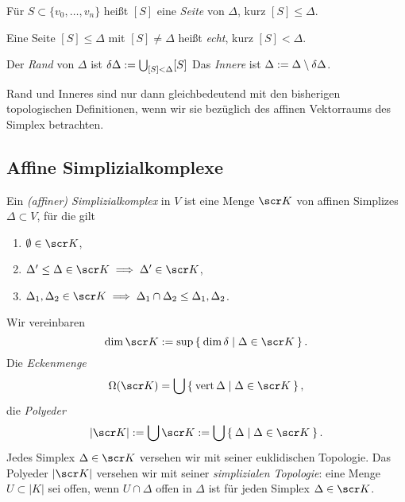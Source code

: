\begin{df}
	Für $S \subset \{v_0, \dotsc, v_n\}$ heißt $[S]$ eine \emph{Seite} von $\Delta$, kurz $[S] \le \Delta$.

	Eine Seite $[S] \le \Delta$ mit $[S] \neq \Delta$ heißt \emph{echt}, kurz $[S] < \Delta$.

	Der \emph{Rand} von $\Delta$ ist $\delta \Delta := \bigcup_{[S] < \Delta} [S]$
	Das \emph{Innere} ist $\Delta := \Delta \setminus \delta \Delta$.

	\begin{note}
		Rand und Inneres sind nur dann gleichbedeutend mit den bisherigen topologischen Definitionen, wenn wir sie bezüglich des affinen Vektorraums des Simplex betrachten.
	\end{note}
\end{df}


\subsection{Affine Simplizialkomplexe}



\begin{df}
	Ein \emph{(affiner) Simplizialkomplex} in $V$ ist eine Menge $\scr K$ von affinen Simplizes $\Delta \subset V$, für die gilt
	\begin{enumerate}[1), start=0]
		\item
			$\emptyset \in \scr K$,
		\item
			$\Delta' \le \Delta \in \scr K \implies \Delta' \in \scr K$,
		\item
			$\Delta_1, \Delta_2 \in \scr K \implies \Delta_1 \cap \Delta_2 \le \Delta_1, \Delta_2$.
	\end{enumerate}
	Wir vereinbaren
	\[
		\dim \scr K := \sup \Set{ \dim \delta | \Delta \in \scr K }.
	\]
	Die \emph{Eckenmenge}
	\[
		\Omega(\scr K) = \bigcup \Set{ \vert \Delta | \Delta \in \scr K },
	\]
	die \emph{Polyeder}
	\[
		|\scr K| := \bigcup \scr K := \bigcup \Set{ \Delta | \Delta \in \scr K }.
	\]
	Jedes Simplex $\Delta \in \scr K$ versehen wir mit seiner euklidischen Topologie.
	Das Polyeder $|\scr K|$ versehen wir mit seiner \emph{simplizialen Topologie}:
	eine Menge $U \subset |K|$ sei offen, wenn $U \cap \Delta$ offen in $\Delta$ ist für jeden Simplex $\Delta \in \scr K$.
\end{df}

